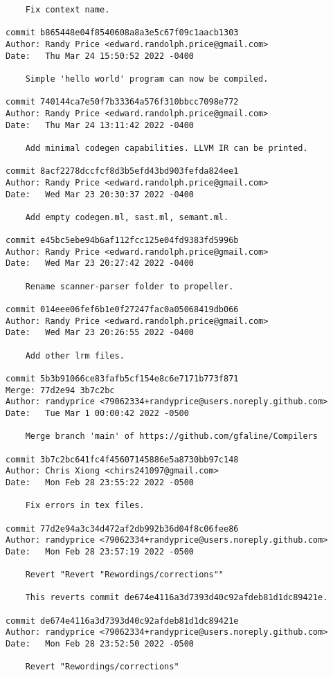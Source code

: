 {\begin{verbatim}
    Fix context name.

commit b865448e04f8540608a8a3e5c67f09c1aacb1303
Author: Randy Price <edward.randolph.price@gmail.com>
Date:   Thu Mar 24 15:50:52 2022 -0400

    Simple 'hello world' program can now be compiled.

commit 740144ca7e50f7b33364a576f310bbcc7098e772
Author: Randy Price <edward.randolph.price@gmail.com>
Date:   Thu Mar 24 13:11:42 2022 -0400

    Add minimal codegen capabilities. LLVM IR can be printed.

commit 8acf2278dccfcf8d3b5efd43bd903fefda824ee1
Author: Randy Price <edward.randolph.price@gmail.com>
Date:   Wed Mar 23 20:30:37 2022 -0400

    Add empty codegen.ml, sast.ml, semant.ml.

commit e45bc5ebe94b6af112fcc125e04fd9383fd5996b
Author: Randy Price <edward.randolph.price@gmail.com>
Date:   Wed Mar 23 20:27:42 2022 -0400

    Rename scanner-parser folder to propeller.

commit 014eee06fef6b1e0f27247fac0a05068419db066
Author: Randy Price <edward.randolph.price@gmail.com>
Date:   Wed Mar 23 20:26:55 2022 -0400

    Add other lrm files.

commit 5b3b91066ce83fafb5cf154e8c6e7171b773f871
Merge: 77d2e94 3b7c2bc
Author: randyprice <79062334+randyprice@users.noreply.github.com>
Date:   Tue Mar 1 00:00:42 2022 -0500

    Merge branch 'main' of https://github.com/gfaline/Compilers

commit 3b7c2bc641fc4f45607145886e5a8730bb97c148
Author: Chris Xiong <chirs241097@gmail.com>
Date:   Mon Feb 28 23:55:22 2022 -0500

    Fix errors in tex files.

commit 77d2e94a3c34d472af2db992b36d04f8c06fee86
Author: randyprice <79062334+randyprice@users.noreply.github.com>
Date:   Mon Feb 28 23:57:19 2022 -0500

    Revert "Revert "Rewordings/corrections""
    
    This reverts commit de674e4116a3d7393d40c92afdeb81d1dc89421e.

commit de674e4116a3d7393d40c92afdeb81d1dc89421e
Author: randyprice <79062334+randyprice@users.noreply.github.com>
Date:   Mon Feb 28 23:52:50 2022 -0500

    Revert "Rewordings/corrections"
    

\end{verbatim}}
